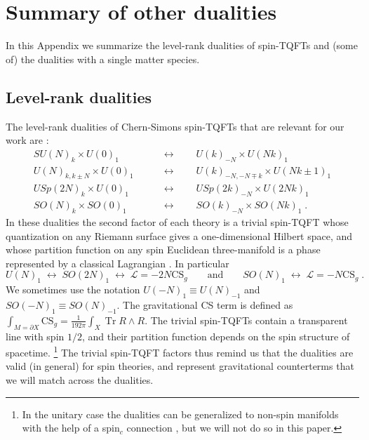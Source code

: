 \documentclass[a4paper, 12pt]{article}
\numberwithin{equation}{section}
\newcommand{\be}{\begin{equation}} \newcommand{\ee}{\end{equation}}
\newcommand{\bea}{\begin{equation} \begin{aligned}} \newcommand{\eea}{\end{aligned} \end{equation}}
\newcommand{\cL}{\mathcal{L}}
\DeclareMathOperator{\Tr}{Tr}
\begin{document}

\section{Summary of other dualities}
\label{app: summary}

In this Appendix we summarize the level-rank dualities of spin-TQFTs and (some of) the dualities with a single matter species.


\subsection{Level-rank dualities}
\label{app: level-rank dualities}

The level-rank dualities of Chern-Simons spin-TQFTs that are relevant for our work are \cite{Naculich:1990pa, Mlawer:1990uv, Verstegen:1990at, Witten:1993xi, Naculich:2007nc, Hsin:2016blu, Aharony:2016jvv}:
\bea
\label{level-rank dualities}
SU(N)_k \times U(0)_1 \qquad&\longleftrightarrow\qquad U(k)_{-N} \times U(Nk)_1 \\[.2em]
U(N)_{k, k \pm N} \times U(0)_1 \qquad&\longleftrightarrow\qquad U(k)_{-N, -N \mp k} \times U(Nk \pm 1)_1 \\[.2em]
USp(2N)_k \times U(0)_1 \qquad&\longleftrightarrow\qquad USp(2k)_{-N} \times U(2Nk)_1 \\[.2em]
SO(N)_k \times SO(0)_1 \qquad&\longleftrightarrow\qquad SO(k)_{-N} \times SO(Nk)_1 \;.
\eea
In these dualities the second factor of each theory is a trivial spin-TQFT whose quantization on any Riemann surface gives a one-dimensional Hilbert space, and whose partition function on any spin Euclidean three-manifold is a phase represented by a classical Lagrangian \cite{Seiberg:2016rsg, Seiberg:2016gmd}. In particular
\be
U(N)_1 \;\leftrightarrow\; SO(2N)_1 \;\leftrightarrow\; \cL = -2N\text{CS}_g \qquad\text{and}\qquad SO(N)_1 \;\leftrightarrow\; \cL = -N\text{CS}_g \;.
\ee
We sometimes use the notation $U(-N)_1 \equiv U(N)_{-1}$ and $SO(-N)_1 \equiv SO(N)_{-1}$. The gravitational CS term is defined as $\int_{M = \partial X} \text{CS}_g = \frac1{192\pi} \int_X \Tr R \wedge R$. The trivial spin-TQFTs contain a transparent line with spin $1/2$, and their partition function depends on the spin structure of spacetime.%
\footnote{In the unitary case the dualities can be generalized to non-spin manifolds with the help of a spin$_c$ connection \cite{Seiberg:2016rsg, Seiberg:2016gmd}, but we will not do so in this paper.}
The trivial spin-TQFT factors thus remind us that the dualities are valid (in general) for spin theories, and represent gravitational counterterms that we will match across the dualities.
\end{document}
